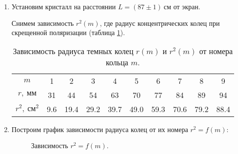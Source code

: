 \documentclass{lab}
\begin{document}
\begin{enumerate}
\item
Установим кристалл на расстоянии $ L = (87 \pm 1)~см $ от экран.

Снимем зависимость $ r^2(m) $, где радиус концентрических колец при скрещенной поляризации (таблица \ref{tab1}).

\begin{table}[H]
	\hspace{-1cm}
	\centering
		\begin{tabular}{|c|ccccccccc|}
			\hline
			$m$			&1 &2 &3 &4 &5 &6 &7 &8 &9 \\
			$r,~мм$		&31 &44 &54 &63 &70 &77 &84 &89 &94 \\
			$r^2,~см^2$	&9.6 &19.4 &29.2 &39.7 &49.0 &59.3 &70.6 &79.2 &88.4 \\ \hline
		\end{tabular}
	\caption{Зависимость радиуса темных колец $ r(m) $ и $ r^2(m) $ от номера кольца $ m $.}
	\label{tab1}
\end{table}

\item
Построим график зависимости радиуса колец от их номера $ r^2 = f(m) $:

\begin{figure}[H]
	\centering
	\caption{Зависимость $ r^2=f(m) $.}
	\label{g_1}
\end{figure}


\end{enumerate}
\end{document}
